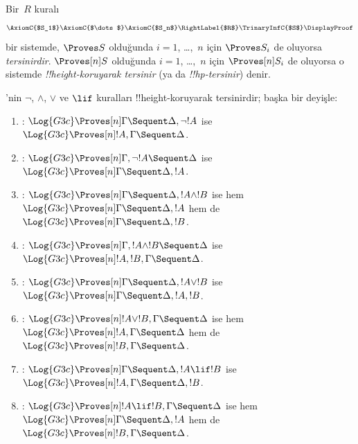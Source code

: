 \documentclass[../../../include/open-logic-section]{subfiles}
\begin{document}


\begin{defn}
Bir~$R$ kuralı
\[
\AxiomC{$S_1$}
\AxiomC{$\dots$}
\AxiomC{$S_n$}
\RightLabel{$R$}
\TrinaryInfC{$S$}
\DisplayProof
\]
bir sistemde, $\Proves S$ olduğunda $i = 1$, \dots,~$n$ için
$\Proves S_i$ de oluyorsa \emph{tersinirdir}. $\Proves[n] S$ olduğunda
$i = 1$, \dots,~$n$ için $\Proves[n] S_i$ de oluyorsa o sistemde
\emph{!!{height}-koruyarak tersinir} (ya da \emph{!!{hp}-tersinir}) denir.
\end{defn}

\begin{lem}
'nin $\lnot$, $\land$, $\lor$ ve $\lif$ kuralları
!!{height}-koruyarak tersinirdir; başka bir deyişle:
\begin{enumerate}
  \item \RightR{\lnot}: $\Log{G3c} \Proves[n] \Gamma \Sequent
  \Delta, \lnot !A$ ise $\Log{G3c} \Proves[n] !A, \Gamma \Sequent
  \Delta$.
  \item \LeftR{\lnot}: $\Log{G3c} \Proves[n] \Gamma, \lnot !A
  \Sequent \Delta$ ise $\Log{G3c} \Proves[n] \Gamma \Sequent \Delta,
  !A$.
  \item \RightR{\land}: $\Log{G3c} \Proves[n] \Gamma \Sequent
  \Delta, !A \land !B$ ise hem $\Log{G3c} \Proves[n] \Gamma \Sequent
  \Delta, !A$ hem de $\Log{G3c} \Proves[n] \Gamma \Sequent
  \Delta, !B$.
  \item \LeftR{\land}: $\Log{G3c} \Proves[n] \Gamma, !A \land !B
  \Sequent \Delta$ ise $\Log{G3c} \Proves[n] !A, !B, \Gamma \Sequent
  \Delta$.
  \item \RightR{\lor}: $\Log{G3c} \Proves[n] \Gamma \Sequent
  \Delta, !A \lor !B$ ise $\Log{G3c} \Proves[n] \Gamma \Sequent
  \Delta, !A, !B$.
  \item \LeftR{\lor}: $\Log{G3c} \Proves[n] !A \lor !B, \Gamma
  \Sequent \Delta$ ise hem $\Log{G3c} \Proves[n] !A, \Gamma \Sequent
  \Delta$ hem de $\Log{G3c} \Proves[n] !B, \Gamma \Sequent \Delta$.
  \item \RightR{\lif}: $\Log{G3c} \Proves[n] \Gamma \Sequent
  \Delta, !A \lif !B$ ise $\Log{G3c} \Proves[n] !A, \Gamma \Sequent
  \Delta, !B$.
  \item \LeftR{\lif}: $\Log{G3c} \Proves[n] !A \lif !B, \Gamma
  \Sequent \Delta$ ise hem $\Log{G3c} \Proves[n] \Gamma \Sequent
  \Delta, !A$ hem de $\Log{G3c} \Proves[n] !B, \Gamma \Sequent \Delta$.
\end{enumerate}
\end{lem}
\end{document}
